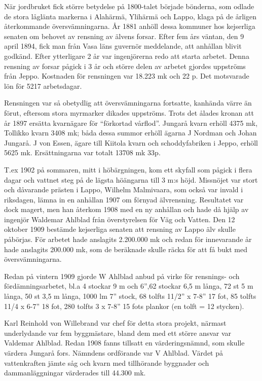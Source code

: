 När jordbruket fick större betydelse på 1800-talet började bönderna, som odlade de stora låglänta markerna i Alahärmä, Ylihärmä och Lappo, klaga på de årligen återkommande översvämningarna. År 1881 anhöll dessa kommuner hos kejserliga senaten om behovet av rensning av älvens forsar. Efter fem års väntan, den 9 april 1894, fick man från Vasa läns guvernör meddelande, att anhållan blivit godkänd. Efter ytterligare 2 år var ingenjörerna redo att starta arbetet. Denna rensning av forsar pågick i 3 år och större delen av arbetet gjordes uppströms från Jeppo. Kostnaden för rensningen var 18.223 mk och 22 p. Det motsvarade lön för 5217 arbetsdagar.

Rensningen var så obetydlig att översvämningarna 	fortsatte, kanhända värre än förut, eftersom stora myrmarker dikades uppströms. Trots det ålades kronan att år 1897 ersätta kvarnägare för ``förkortad vårflod''. Jungarå kvarn erhöll 4375 mk, Tollikko kvarn 3408 mk; båda dessa summor erhöll ägarna J Nordman och Johan Jungarå. J von Essen, ägare till Kiitola kvarn och schoddyfabriken i Jeppo, erhöll 5625 mk. Ersättningarna var totalt 13708 mk 33p.

T.ex 1902 på sommaren, mitt i höbärgningen, kom ett skyfall som pågick i flera dagar och vattnet steg på de lägsta höängarna till 3 m:s höjd. Missnöjet var stort och dåvarande prästen i Lappo, Wilhelm Malmivaara, som också var invald i riksdagen, lämna in en anhållan 1907 om förnyad älvrensning. Resultatet var dock magert, men han återkom 1908 med en ny anhållan och hade då hjälp av ingenjör Waldemar Ahlblad från överstyrelsen 	för Väg och Vatten. Den 12 oktober 1909 bestämde kejserliga senaten att rensning av Lappo älv skulle påbörjas. För arbetet hade anslagits 2.200.000 mk och redan för innevarande år hade anslagits 200.000 mk, som de beräknade skulle räcka för att få bukt med översvämningarna.

Redan på vintern 1909 gjorde W Ahlblad anbud på virke för rensnings- och 	fördämningsarbetet, bl.a 4 stockar 9 m och 6”,62 stockar 6,5 m långa, 72 st 5 m långa, 50 st 3,5 m långa, 1000 lm 7” stock, 68 tolfts 11/2” x 7-8” 17 fot, 85 tolfts 11/4 x 6-7” 18 fot, 280 tolfts 3 x 7-8” 15 fots plankor (en tolft = 12 stycken).

Karl Reinhold von Willebrand var chef för detta stora projekt, närmast underlydande var fem byggmästare, bland dem med ett större ansvar var Valdemar Ahlblad. Redan 1908 fanns tillsatt en värderingsnämnd, som skulle värdera Jungarå fors. Nämndens ordförande var V Ahlblad. Värdet på vattenkraften jämte såg och kvarn med tillhörande byggnader och dammanläggningar värderades till 44.300 mk.

